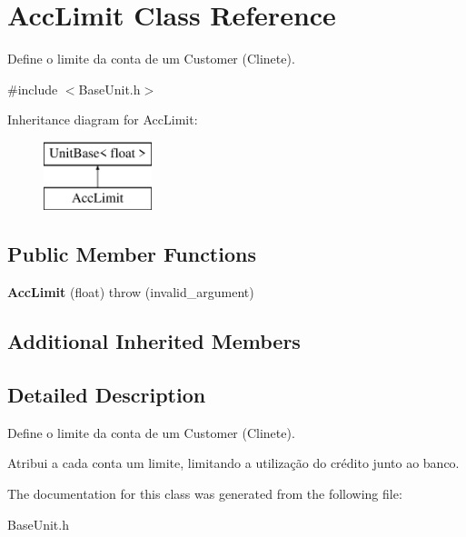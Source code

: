 \hypertarget{classAccLimit}{\section{Acc\-Limit Class Reference}
\label{classAccLimit}
}


Define o limite da conta de um Customer (Clinete).  




{\ttfamily \#include $<$Base\-Unit.\-h$>$}

Inheritance diagram for Acc\-Limit\-:\begin{figure}[H]
\begin{center}
\leavevmode
\includegraphics[height=2.000000cm]{classAccLimit}
\end{center}
\end{figure}
\subsection*{Public Member Functions}
\begin{DoxyCompactItemize}
\item 
\hypertarget{classAccLimit_a64069320aa23de7c9570ec9e5092eee6}{{\bfseries Acc\-Limit} (float)  throw (invalid\-\_\-argument)}\label{classAccLimit_a64069320aa23de7c9570ec9e5092eee6}

\end{DoxyCompactItemize}
\subsection*{Additional Inherited Members}


\subsection{Detailed Description}
Define o limite da conta de um Customer (Clinete). 

Atribui a cada conta um limite, limitando a utilização do crédito junto ao banco. 

The documentation for this class was generated from the following file\-:\begin{DoxyCompactItemize}
\item 
Base\-Unit.\-h\end{DoxyCompactItemize}
